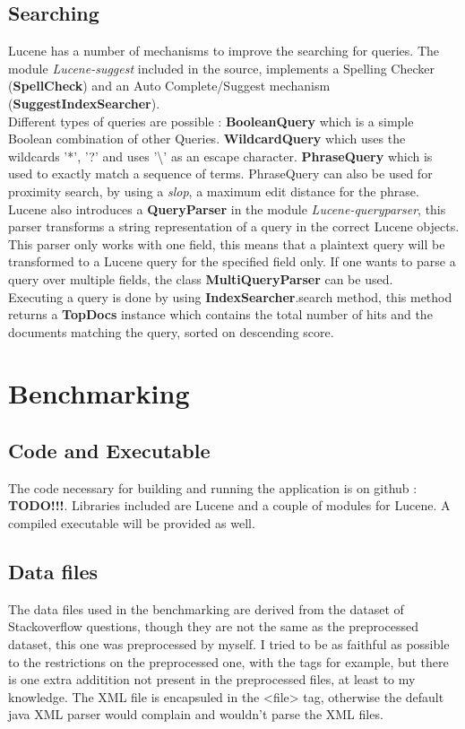 \documentclass{article}
\begin{document}
\subsection{Searching}
Lucene has a number of mechanisms to improve the searching for queries. The module \textit{Lucene-suggest} included in the source, implements a Spelling Checker (\textbf{SpellCheck}) and an Auto Complete/Suggest mechanism (\textbf{SuggestIndexSearcher}). \\

Different types of queries are possible : \textbf{BooleanQuery} which is a simple Boolean combination of other Queries. \textbf{WildcardQuery} which uses the wildcards '*', '?' and uses '\textbackslash' as an escape character. \textbf{PhraseQuery} which is used to exactly match a sequence of terms. PhraseQuery can also be used for proximity search, by using a \textit{slop}, a maximum edit distance for the phrase. \\

Lucene also introduces a \textbf{QueryParser} in the module \textit{Lucene-queryparser}, this parser transforms a string representation of a query in the correct Lucene objects. This parser only works with one field, this means that a plaintext query will be transformed to a Lucene query for the specified field only. If one wants to parse a query over multiple fields, the class \textbf{MultiQueryParser} can be used.\\

Executing a query is done by using \textbf{IndexSearcher}.search method, this method returns a \textbf{TopDocs} instance which contains the total number of hits and the documents matching the query, sorted on descending score.

\section{Benchmarking}
\subsection{Code and Executable}
The code necessary for building and running the application is on github : \textbf{TODO!!!}. Libraries included are Lucene and a couple of modules for Lucene. A compiled executable will be provided as well.

\subsection{Data files}
The data files used in the benchmarking are derived from the dataset of Stackoverflow questions, though they are not the same as the preprocessed dataset, this one was preprocessed by myself. I tried to be as faithful as possible to the restrictions on the preprocessed one, with the tags for example, but there is one extra additition not present in the preprocessed files, at least to my knowledge. The XML file is encapsuled in the <file> tag, otherwise the default java XML parser would complain and wouldn't parse the XML files.
\end{document}
